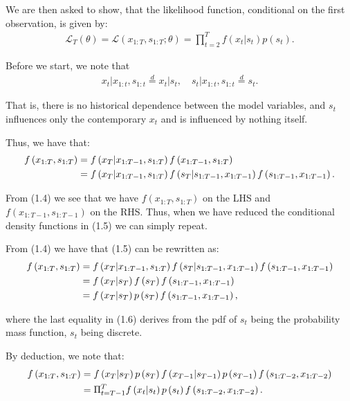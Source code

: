 \documentclass[11pt,a4paper,oneside]{article}
\newcommand{\lll}{\mathcal{L}}
\newcommand{\lp}{\left(}
\newcommand{\rp}{\right)}
\begin{document}
We are then asked to show, that the likelihood function, conditional on the first observation, is given by:
\begin{align}
    \lll_T\lp \theta\rp = \lll\lp x_{1:T}, s_{1:T}; \theta\rp = \prod_{t=2}^T f\lp x_t\vert s_t\rp p\lp s_t\rp.
\end{align}

Before we start, we note that
\begin{align}
x_t \vert x_{1:t}, s_{1:t} \overset{d}{=} x_t \vert s_t, \quad  s_t \vert x_{1:t}, s_{1:t} \overset{d}{=} s_t.
\end{align}

That is, there is no historical dependence between the model variables, and $s_t$ influences only the contemporary $x_t$ and is influenced by nothing itself.

Thus, we have that:
\begin{align}
    f\lp x_{1:T}, s_{1:T} \rp 
        &= f\lp x_T \vert x_{1:T-1}, s_{1:T} \rp f\lp x_{1:T-1}, s_{1:T}\rp \notag \\
        &= f\lp x_T \vert x_{1:T-1}, s_{1:T} \rp f\lp s_T\vert s_{1:T-1}, x_{1:T-1} \rp f\lp s_{1:T-1}, x_{1:T-1}\rp.
\end{align}

From (1.4) we see that we have $f\lp x_{1:T}, s_{1:T}\rp$ on the LHS and $f\lp x_{1:T-1}, s_{1:T-1}\rp$ on the RHS. Thus, when we have reduced the conditional density functions in (1.5) we can simply repeat.

From (1.4) we have that (1.5) can be rewritten as:
\begin{align}
    f\lp x_{1:T}, s_{1:T} \rp 
        &= f\lp x_T \vert x_{1:T-1}, s_{1:T} \rp f\lp s_T\vert s_{1:T-1}, x_{1:T-1} \rp f\lp s_{1:T-1}, x_{1:T-1}\rp \notag \\
        &= f\lp x_T \vert s_T \rp f\lp s_T \rp f\lp s_{1:T-1}, x_{1:T-1}\rp \notag \\
        &= f\lp x_T \vert s_T \rp p\lp s_T\rp f\lp s_{1:T-1}, x_{1:T-1}\rp,
\end{align}

where the last equality in (1.6) derives from the pdf of $s_t$ being the probability mass function, $s_t$ being discrete.

By deduction, we note that:
\begin{align}
    f\lp x_{1:T}, s_{1:T} \rp 
        &= f\lp x_T \vert s_T \rp p\lp s_T\rp  f\lp x_{T-1} \vert s_{T-1} \rp p\lp s_{T-1}\rp f\lp s_{1:T-2}, x_{1:T-2}\rp \notag \\
        &= \Pi_{t=T-1}^T  f\lp x_t \vert s_t \rp p\lp s_t\rp f\lp s_{1:T-2}, x_{1:T-2}\rp.
\end{align}
\end{document}
